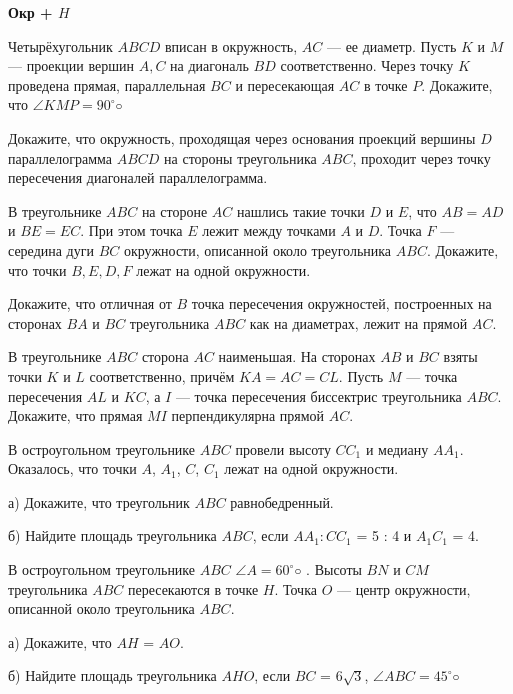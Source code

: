 \centerline{\bf \Huge Окр + $H$}
\centerline{\bf \Huge }


 Четырёхугольник $ABCD$ вписан в окружность, $AC$ — ее диаметр. Пусть $K$ и $M$ — проекции вершин $A, C$ на диагональ $BD$ соответственно. Через точку $K$ проведена прямая, параллельная $BC$ и пересекающая $AC$ в точке $P$. Докажите, что $\angle KMP = 90^{\circ}◦$

 Докажите, что окружность, проходящая через основания проекций вершины $D$ параллелограмма $ABCD$ на стороны треугольника $ABC$, проходит через точку пересечения диагоналей
параллелограмма.

 В треугольнике $ABC$ на стороне $AC$ нашлись такие точки $D$ и $E$, что $AB = AD$ и
$BE = EC$. При этом точка $E$ лежит между точками $A$ и $D$. Точка $F$ — середина дуги $BC$
окружности, описанной около треугольника $ABC$. Докажите, что точки $B, E, D, F$ лежат на
одной окружности.

 Докажите, что отличная от $B$ точка пересечения окружностей, построенных на сторонах
$BA$ и $BC$ треугольника $ABC$ как на диаметрах, лежит на прямой $AC$.

 В треугольнике $ABC$ сторона $AC$ наименьшая. На сторонах $AB$ и $BC$ взяты точки $K$
и $L$ соответственно, причём $KA = AC = CL$. Пусть $M$ — точка пересечения $AL$ и $KC$, а $I$ —
точка пересечения биссектрис треугольника $ABC$. Докажите, что прямая $MI$ перпендикулярна
прямой $AC$.

 В остроугольном треугольнике $ABC$ провели высоту $CC_1$ и медиану $AA_1$. Оказалось,
что точки $A$, $A_1$, $C$, $C_1$ лежат на одной окружности.

а) Докажите, что треугольник $ABC$ равнобедренный.

б) Найдите площадь треугольника $ABC$, если $AA_1 : CC_1$ = 5 : 4 и $A_1C_1$ = 4.

 В остроугольном треугольнике $ABC$ $\angle A = 60^{\circ}◦$
. Высоты $BN$ и $CM$ треугольника $ABC$
пересекаются в точке $H$. Точка $O$ — центр окружности, описанной около треугольника $ABC$.

а) Докажите, что $AH$ = $AO$.

б) Найдите площадь треугольника $AHO$, если $BC$ = $6\sqrt{3}$, $\angle ABC = 45^{\circ}◦$
